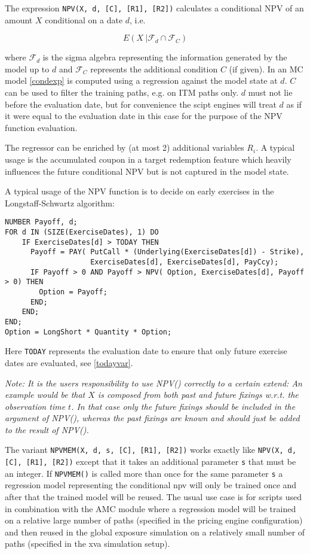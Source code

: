 The expression {\tt NPV(X, d, [C], [R1], [R2])} calculates a conditional NPV of an amount $X$ conditional on a date $d$, i.e.

\begin{equation}\label{condexp}
  E( X\: | \mathcal{F}_d \cap \mathcal{F}_C )
\end{equation}

where $\mathcal{F}_d$ is the sigma algebra representing the information generated by the model up to $d$ and
$\mathcal{F}_C$ represents the additional condition $C$ (if given). In an MC model \ref{condexp} is computed using a
regression against the model state at $d$. $C$ can be used to filter the training paths, e.g. on ITM paths only. $d$
must not lie before the evaluation date, but for convenience the scipt engines will treat $d$ as if it were equal to the
evaluation date in this case for the purpose of the NPV function evaluation.

The regressor can be enriched by (at most 2) additional variables $R_i$. A typical usage is the accumulated coupon in a
target redemption feature which heavily influences the future conditional NPV but is not captured in the model state.

A typical usage of the NPV function is to decide on early exercises in the Longstaff-Schwartz algorithm:

\begin{verbatim}
NUMBER Payoff, d;
FOR d IN (SIZE(ExerciseDates), 1) DO
    IF ExerciseDates[d] > TODAY THEN
      Payoff = PAY( PutCall * (Underlying(ExerciseDates[d]) - Strike),
                    ExerciseDates[d], ExerciseDates[d], PayCcy);
      IF Payoff > 0 AND Payoff > NPV( Option, ExerciseDates[d], Payoff > 0) THEN
        Option = Payoff;
      END;
    END;
END;
Option = LongShort * Quantity * Option;
\end{verbatim}

Here \verb+TODAY+ represents the evaluation date to ensure that only future exercise dates are evaluated, see
\ref{todayvar}.

{\em Note: It is the users responsibility to use NPV() correctly to a certain extend: An example would be that $X$ is
  composed from both past and future fixings w.r.t. the observation time $t$. In that case only the future fixings
  should be included in the argument of NPV(), whereas the past fixings are known and should just be added to the result
  of NPV().}

The variant {\tt NPVMEM(X, d, s, [C], [R1], [R2])} works exactly like {\tt NPV(X, d, [C], [R1], [R2])} except that it
takes an additional parameter \verb+s+ that must be an integer. If \verb+NPVMEM()+ is called more than once for the same
parameter \verb+s+ a regression model representing the conditional npv will only be trained once and after that the
trained model will be reused. The usual use case is for scripts used in combination with the AMC module where a
regression model will be trained on a relative large number of paths (specified in the pricing engine configuration) and
then reused in the global exposure simulation on a relatively small number of paths (specified in the xva simulation
setup).

